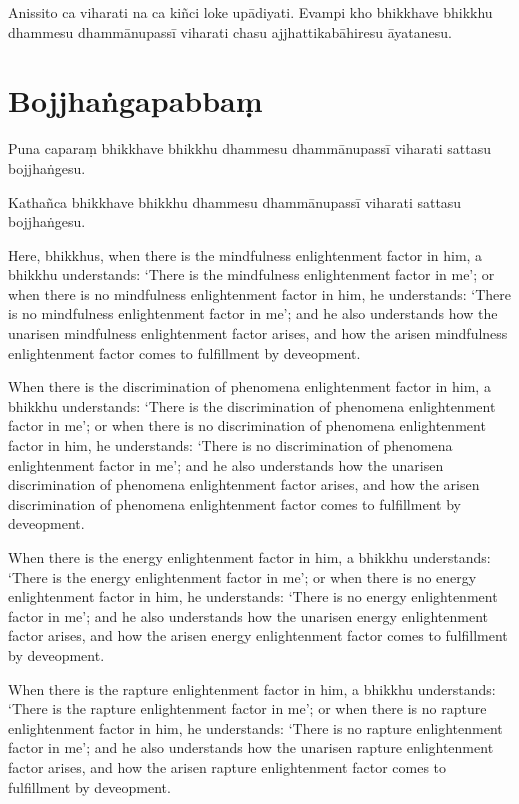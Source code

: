 Anissito ca viharati na ca kiñci loke upādiyati. Evampi kho bhikkhave bhikkhu
dhammesu dhammānupassī viharati chasu ajjhattikabāhiresu āyatanesu.


\section*{Bojjhaṅgapabbaṃ}

Puna caparaṃ bhikkhave bhikkhu dhammesu dhammānupassī viharati sattasu
bojjhaṅgesu.

Kathañca bhikkhave bhikkhu dhammesu dhammānupassī viharati sattasu bojjhaṅgesu.

\englishPage

Here, bhikkhus, when there is the mindfulness enlightenment factor in him, a
bhikkhu understands: `There is the mindfulness enlightenment factor in me'; or
when there is no mindfulness enlightenment factor in him, he understands: `There
is no mindfulness enlightenment factor in me'; and he also understands how the
unarisen mindfulness enlightenment factor arises, and how the arisen mindfulness
enlightenment factor comes to fulfillment by deveopment.

When there is the discrimination of phenomena enlightenment factor in him, a
bhikkhu understands: `There is the discrimination of phenomena enlightenment
factor in me'; or when there is no discrimination of phenomena enlightenment
factor in him, he understands: `There is no discrimination of phenomena
enlightenment factor in me'; and he also understands how the unarisen
discrimination of phenomena enlightenment factor arises, and how the arisen
discrimination of phenomena enlightenment factor comes to fulfillment by
deveopment.

When there is the energy enlightenment factor in him, a bhikkhu understands:
`There is the energy enlightenment factor in me'; or when there is no energy
enlightenment factor in him, he understands: `There is no energy enlightenment
factor in me'; and he also understands how the unarisen energy enlightenment
factor arises, and how the arisen energy enlightenment factor comes to
fulfillment by deveopment.

When there is the rapture enlightenment factor in him, a bhikkhu understands:
`There is the rapture enlightenment factor in me'; or when there is no rapture
enlightenment factor in him, he understands: `There is no rapture enlightenment
factor in me'; and he also understands how the unarisen rapture enlightenment
factor arises, and how the arisen rapture enlightenment factor comes to
fulfillment by deveopment.

